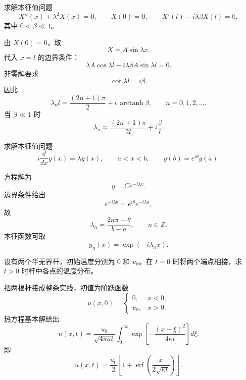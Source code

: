 \begin{question}
求解本征值问题
\[
X''(x)+\lambda^2X(x)=0,\qquad
X(0)=0,\qquad X'(l)-i\lambda\beta X(l)=0,
\]
其中 \(0<\beta\ll1\)。
\begin{solution}
由 \(X(0)=0\)，取
\[
X=A\sin\lambda x.
\]
代入 \(x=l\) 的边界条件：
\[
\lambda A\cos\lambda l-i\lambda\beta A\sin\lambda l=0.
\]
非零解要求
\[
\cot\lambda l=i\beta.
\]
因此
\[
\lambda_n l=\frac{(2n+1)\pi}{2}+i\,\operatorname{arctanh}\beta,
\qquad n=0,1,2,\ldots .
\]
当 \(\beta\ll1\) 时
\[
\lambda_n\approx \frac{(2n+1)\pi}{2l}+i\frac{\beta}{l}.
\]
\end{solution}
\end{question}

\begin{question}
求解本征值问题
\[
i\frac d{dx}y(x)=\lambda y(x),\qquad a<x<b,\qquad
y(b)=e^{i\theta}y(a).
\]
\begin{solution}
方程解为
\[
y=C e^{-i\lambda x}.
\]
边界条件给出
\[
e^{-i\lambda b}=e^{i\theta}e^{-i\lambda a},
\]
故
\[
\lambda_n=\frac{2n\pi-\theta}{b-a},\qquad n\in\mathbb Z.
\]
本征函数可取
\[
y_n(x)=\exp\left(-i\lambda_n x\right).
\]
\end{solution}
\end{question}

\begin{question}
设有两个半无界杆，初始温度分别为 \(0\) 和 \(u_0\)。在 \(t=0\) 时将两个端点相接，求 \(t>0\) 时杆中各点的温度分布。

\begin{solution}
把两根杆接成整条实线，初值为阶跃函数
\[
u(x,0)=
\begin{cases}
0,&x<0,\\
u_0,&x>0.
\end{cases}
\]
热方程基本解给出
\[
u(x,t)=\frac{u_0}{\sqrt{4\pi\kappa t}}\int_0^\infty
\exp\left[-\frac{(x-\xi)^2}{4\kappa t}\right]d\xi.
\]
即
\[
u(x,t)=\frac{u_0}{2}\left[
1+\operatorname{erf}\left(\frac{x}{2\sqrt{\kappa t}}\right)
\right].
\]
\end{solution}
\end{question}

